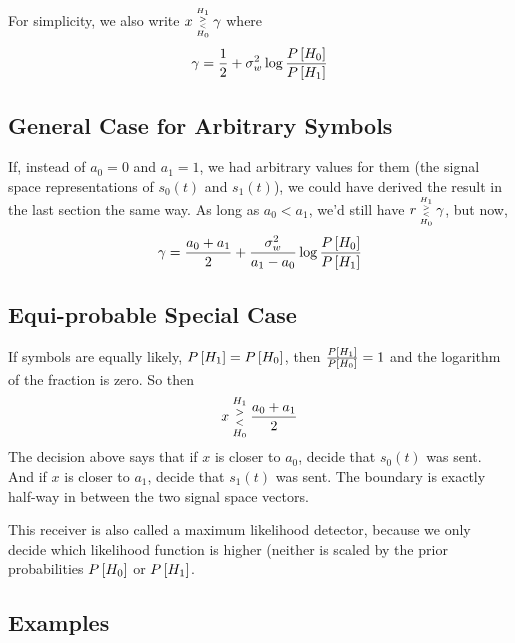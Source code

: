 For simplicity, we also write $x  {{H_1 \atop >} \atop {< \atop H_0}} \gamma$ where
\begin{equation} \label{E:decisionThreshold}
  \gamma = \frac{1}{2} + \sigma_w^2 \log \frac{  P\left[{H_0}\right]}{P\left[{H_1}\right]}
\end{equation}

\subsection{General Case for Arbitrary Symbols}

If, instead of $a_0 = 0$ and $a_1 = 1$, we had arbitrary values for
them (the signal space representations of $s_0(t)$ and $s_1(t)$), we
could have derived the result in the last section the same way.  As
long as $a_0 < a_1$, we'd still have $r {{H_1 \atop >} \atop {< \atop H_0}} \gamma$,
but now,
\begin{equation} \label{E:decisionThresholdGeneral}
  \gamma = \frac{a_0 + a_1}{2} + \frac{\sigma_w^2}{a_1 - a_0} \log \frac{  P\left[{H_0}\right]}{P\left[{H_1}\right]}
\end{equation}

\subsection{Equi-probable Special Case}

If symbols are equally likely, $P\left[{H_1}\right] = P\left[{H_0}\right]$, then
$\frac{P\left[{H_1}\right]}{  P\left[{H_0}\right]} = 1$ and the logarithm of the fraction
is zero.  So then
\[
 x  {{H_1 \atop >} \atop {< \atop H_0}} \frac{a_0 + a_1}{2}
\]
The decision above says that if $x$ is closer to $a_0$, decide that
$s_0(t)$ was sent. And if $x$ is closer to $a_1$, decide that
$s_1(t)$ was sent. The boundary is exactly half-way in between the
two signal space vectors.

This receiver is also called a maximum likelihood detector, because
we only decide which likelihood function is higher (neither is
scaled by the prior probabilities $P\left[{H_0}\right]$ or $P\left[{H_1}\right]$.

\subsection{Examples}




